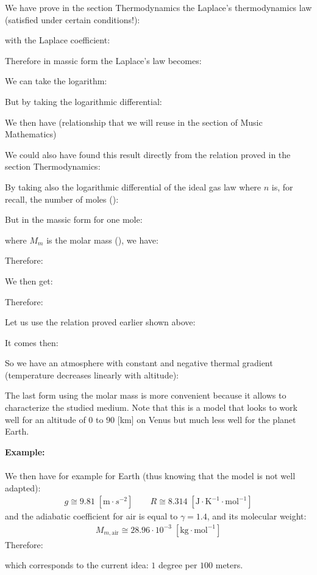 	We have prove in the section Thermodynamics the Laplace's thermodynamics law (satisfied under certain conditions!):
	
	with the Laplace coefficient:
	
	Therefore in massic form the Laplace's law becomes:
	
	We can take the logarithm:
	
	But by taking the logarithmic differential:
	
	We then have (relationship that we will reuse in the section of Music Mathematics)
	
	We could also have found this result directly from the relation proved in the section Thermodynamics:
	
	By taking also the logarithmic differential  of the ideal gas law where $n$ is, for recall, the number of moles ():
	
	But in the massic form for one mole:
	
	where $M_m$ is the molar mass (), we have:
		
	Therefore:
	
	We then get:
	
	Therefore:
	
	Let us use the relation proved earlier shown above:
	
	It comes then:
	
	So we have an atmosphere with constant and negative thermal gradient (temperature decreases linearly with altitude):
	
	The last form using the molar mass is more convenient because it allows to characterize the studied medium. Note that this is a model that looks to work well for an altitude of $0$ to $90$ [km] on Venus but much less well for the planet Earth.
	\begin{tcolorbox}[colframe=black,colback=white,sharp corners]
	\textbf{{\Large {}}Example:}\\\\
	We then have for example for Earth (thus knowing that the model is not well adapted):
	\begin{gather*}
		g\cong 9.81\;[\text{m}\cdot{s}^{-2}]\qquad R\cong 8.314\;[\text{J}\cdot \text{K}^{-1}\cdot \text{mol}^{-1}]
	\end{gather*}
	and the adiabatic coefficient for air is equal to $\gamma=1.4$, and its molecular weight:
	\begin{gather*}
		M_{m,\text{air}}\cong 28.96\cdot 10^{-3}\;[\text{kg}\cdot\text{mol}^{-1}]
	\end{gather*}
	Therefore:
	
	which corresponds to the current idea: $1$ degree per $100$ meters.
	\end{tcolorbox}
	

